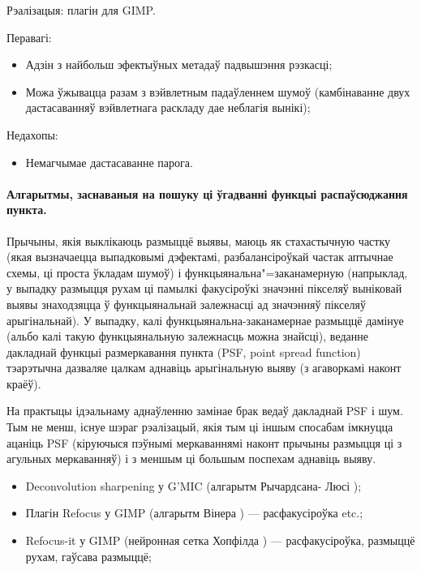 \documentclass[10pt, a5paper]{article}
\begin{document}
Рэалізацыя: плагін для GIMP.

Перавагі:

\begin{itemize}
  \item Адзін з найбольш эфектыўных метадаў падвышэння рэзкасці;
  \item Можа ўжывацца разам з вэйвлетным падаўленнем шумоў \linebreak (камбінаванне двух дастасаванняў вэйвлетнага раскладу дае неблагія вынікі);
\end{itemize}

Недахопы:

\begin{itemize}
  \item Немагчымае дастасаванне парога.
\end{itemize}

\paragraph*{Алгарытмы, заснаваныя на пошуку ці ўгадванні функцыі распаўсюджання пункта.}

Прычыны, якія выклікаюць размыццё выявы, маюць як стахастычную частку (якая вызначаецца выпадковымі дэфектамі, разбалансіроўкай частак аптычнае схемы, ці проста ўкладам шумоў) і функцыянальна"=заканамерную (напрык\-лад, у выпадку размыцця рухам ці памылкі факусіроўкі значэнні пікселяў выніковай выявы знаходзяцца ў функцыянальнай залежнасці ад значэнняў пікселяў арыгінальнай). У выпадку, калі функцыянальна-заканамернае размыццё дамінуе (альбо калі такую функцыянальную залежнасць можна знайсці), веданне дакладнай функцыі размеркавання пункта (PSF, point spread function) тэарэтычна дазваляе цалкам аднавіць арыгінальную выяву (з агаворкамі наконт краёў).

На практыцы ідэальнаму аднаўленню замінае брак ведаў дакладнай PSF і шум. Тым не менш, існуе шэраг рэалізацый, якія тым ці іншым спосабам імкнуцца ацаніць PSF (кіруючыся пэўнымі меркаваннямі наконт прычыны размыцця ці з агульных меркаванняў) і з меншым ці большым поспехам аднавіць выяву.

\begin{itemize}
  \item Deconvolution sharpening у {G'MIC} (алгарытм Рычардсана- \linebreak Люсі \cite{litv2});
  \item Плагін Refocus у {GIMP} (алгарытм Вінера \cite{litv3}) — расфакусіроў\-ка etc.;
  \item Refocus-it у {GIMP} (нейронная сетка Хопфілда \cite{litv4}) — расфаку\-сіроўка, размыццё рухам, гаўсава размыццё;
\end{itemize}
\end{document}
